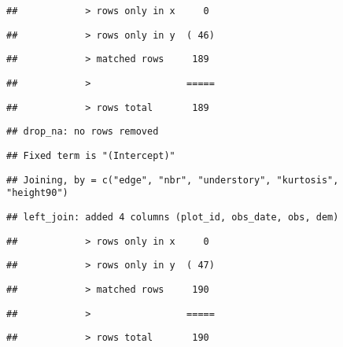 \documentclass[
]{article}
\begin{document}
\begin{verbatim}
##            > rows only in x     0
\end{verbatim}

\begin{verbatim}
##            > rows only in y  ( 46)
\end{verbatim}

\begin{verbatim}
##            > matched rows     189
\end{verbatim}

\begin{verbatim}
##            >                 =====
\end{verbatim}

\begin{verbatim}
##            > rows total       189
\end{verbatim}

\begin{verbatim}
## drop_na: no rows removed
\end{verbatim}

\begin{verbatim}
## Fixed term is "(Intercept)"
\end{verbatim}

\begin{verbatim}
## Joining, by = c("edge", "nbr", "understory", "kurtosis", "height90")
\end{verbatim}

\begin{verbatim}
## left_join: added 4 columns (plot_id, obs_date, obs, dem)
\end{verbatim}

\begin{verbatim}
##            > rows only in x     0
\end{verbatim}

\begin{verbatim}
##            > rows only in y  ( 47)
\end{verbatim}

\begin{verbatim}
##            > matched rows     190
\end{verbatim}

\begin{verbatim}
##            >                 =====
\end{verbatim}

\begin{verbatim}
##            > rows total       190
\end{verbatim}
\end{document}
